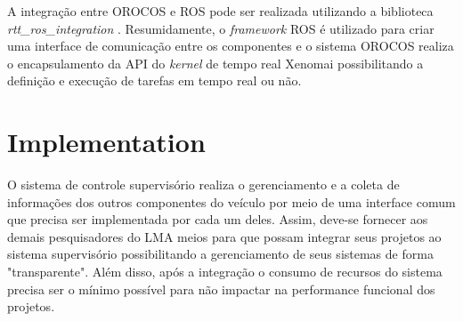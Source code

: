 \documentclass[conference]{IEEEtran}
\begin{document}
A integração entre OROCOS e ROS pode ser realizada utilizando a biblioteca \textit{rtt\_ros\_integration} \cite{rtt_ros_integration}. Resumidamente, o \textit{framework} ROS é utilizado para criar uma interface de comunicação entre os componentes e o sistema OROCOS realiza o encapsulamento da API do \textit{kernel} de tempo real Xenomai possibilitando a definição e execução de tarefas em tempo real ou não.


%	
%	
%	

\section{Implementation}\label{sec:implementation}

O sistema de controle supervisório realiza o gerenciamento e a coleta de informações dos outros componentes do veículo por meio de uma interface comum que precisa ser implementada por cada um deles. Assim, deve-se fornecer aos demais pesquisadores do LMA meios para que possam integrar seus projetos ao sistema supervisório possibilitando a gerenciamento de seus sistemas de forma "transparente". Além disso, após a integração o consumo de recursos do sistema precisa ser o mínimo possível para não impactar na performance funcional dos projetos. 
\end{document}
